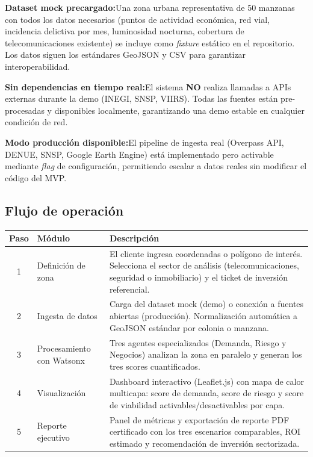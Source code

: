 \documentclass[12pt,a4paper]{article}
\newcommand{\capamvp}[2]{%
  \noindent\textbf{\color{negro}#1}\quad #2\par\vspace{4pt}%
}
\begin{document}
\begin{tcolorbox}[cajasecundaria, title=Estrategia de Datos para el Hackathon]
\capamvp{Dataset mock precargado:}{Una zona urbana representativa de 50 manzanas con todos los datos necesarios (puntos de actividad económica, red vial, incidencia delictiva por mes, luminosidad nocturna, cobertura de telecomunicaciones existente) se incluye como \textit{fixture} estático en el repositorio. Los datos siguen los estándares GeoJSON y CSV para garantizar interoperabilidad.}

\smallskip
\capamvp{Sin dependencias en tiempo real:}{El sistema \textbf{NO} realiza llamadas a APIs externas durante la demo (INEGI, SNSP, VIIRS). Todas las fuentes están pre-procesadas y disponibles localmente, garantizando una demo estable en cualquier condición de red.}

\smallskip
\capamvp{Modo producción disponible:}{El pipeline de ingesta real (Overpass API, DENUE, SNSP, Google Earth Engine) está implementado pero activable mediante \textit{flag} de configuración, permitiendo escalar a datos reales sin modificar el código del MVP.}
\end{tcolorbox}

\subsection{Flujo de operación}

\begin{table}[H]
\centering
\small
\renewcommand{\arraystretch}{1.3}
\begin{tabularx}{\textwidth}{c l X}
\toprule
\rowcolor{grisoscuro}
\color{white}\textbf{Paso} & \color{white}\textbf{Módulo} & \color{white}\textbf{Descripción} \\
\midrule
1 & Definición de zona & El cliente ingresa coordenadas o polígono de interés. Selecciona el sector de análisis (telecomunicaciones, seguridad o inmobiliario) y el ticket de inversión referencial. \\
\rowcolor{fondofila}
2 & Ingesta de datos & Carga del dataset mock (demo) o conexión a fuentes abiertas (producción). Normalización automática a GeoJSON estándar por colonia o manzana. \\
3 & Procesamiento con Watsonx & Tres agentes especializados (Demanda, Riesgo y Negocios) analizan la zona en paralelo y generan los tres scores cuantificados. \\
\rowcolor{fondofila}
4 & Visualización & Dashboard interactivo (Leaflet.js) con mapa de calor multicapa: score de demanda, score de riesgo y score de viabilidad activables/desactivables por capa. \\
5 & Reporte ejecutivo & Panel de métricas y exportación de reporte PDF certificado con los tres escenarios comparables, ROI estimado y recomendación de inversión sectorizada. \\
\bottomrule
\end{tabularx}
\end{table}
\end{document}
